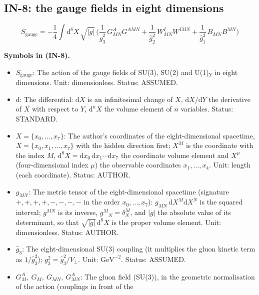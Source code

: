 \documentclass[
  10pt,
]{article}
\providecommand{\tightlist}{%
  \setlength{\itemsep}{0pt}\setlength{\parskip}{0pt}}
\begin{document}
\hypertarget{in-8-the-gauge-fields-in-eight-dimensions}{%
\subsection{IN-8: the gauge fields in eight
dimensions}\label{in-8-the-gauge-fields-in-eight-dimensions}}

\[
S_{\mathrm{gauge}} = -\frac14\int\mathrm{d}^8X\,\sqrt{\lvert g\rvert}\,\Big(\frac{1}{\hat
 g_3^2}\,G^A_{MN}G^{AMN}
 + \frac{1}{\hat g_2^2}\,W^I_{MN}W^{IMN} + \frac{1}{\hat g_1^2}\,B_{MN}B^{MN}\Big) \tag{IN-8}
\]

\textbf{Symbols in (IN-8).}

\begin{itemize}
\tightlist
\item
  \(S_{\mathrm{gauge}}\): The action of the gauge fields of SU(3), SU(2)
  and U(1)\(_Y\) in eight dimensions. Unit: dimensionless. Status:
  ASSUMED.
\item
  \(\mathrm{d}\): The differential: \(\mathrm{d}X\) is an infinitesimal
  change of \(X\), \(\mathrm{d}X/\mathrm{d}Y\) the derivative of \(X\)
  with respect to \(Y\), \(\mathrm{d}^nX\) the volume element of \(n\)
  variables. Status: STANDARD.
\item
  \(X = \{x_0, \dots, x_7\}\): The author's coordinates of the
  eight-dimensional spacetime, \(X = \{x_0, x_1, \dots, x_7\}\) with the
  hidden direction first; \(X^M\) is the coordinate with the index
  \(M\),
  \(\mathrm{d}^8X = \mathrm{d}x_0\,\mathrm{d}x_1\cdots\mathrm{d}x_7\)
  the coordinate volume element and \(X^\mu\) (four-dimensional index
  \(\mu\)) the observable coordinates \(x_1, \dots, x_4\). Unit: length
  (each coordinate). Status: AUTHOR.
\item
  \(g_{MN}\): The metric tensor of the eight-dimensional spacetime
  (signature \(+,+,+,+,-,-,-,-\) in the order \(x_0, \dots, x_7\)):
  \(g_{MN}\,\mathrm{d}X^M\mathrm{d}X^N\) is the squared interval;
  \(g^{MN}\) is its inverse, \(g^M{}_N = \delta^M_N\), and
  \(\lvert g\rvert\) the absolute value of its determinant, so that
  \(\sqrt{\lvert g\rvert}\,\mathrm{d}^8X\) is the proper volume element.
  Unit: dimensionless. Status: AUTHOR.
\item
  \(\hat g_3\): The eight-dimensional SU(3) coupling (it multiplies the
  gluon kinetic term as \(1/\hat g_3^2\));
  \(g_3^2 = \hat g_3^2/V_\perp\). Unit: \(\mathrm{GeV}^{-2}\). Status:
  ASSUMED.
\item
  \(G^A_M,\ G_M,\ G_{MN},\ G^A_{MN}\): The gluon field (SU(3)), in the
  geometric normalisation of the action (couplings in front of the

\end{itemize}
\end{document}
